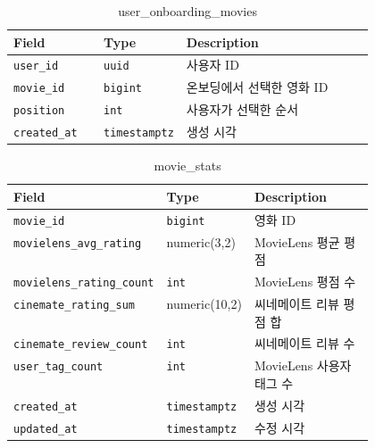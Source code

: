 \documentclass[11pt,a4paper]{article}
\renewcommand{\arraystretch}{1.18}
\begin{document}
\begin{table}[H]
\centering
\footnotesize
\setlength{\tabcolsep}{5pt}
\renewcommand{\arraystretch}{1.28}
\begin{tabularx}{\linewidth}{@{}>{\RaggedRight\arraybackslash}p{0.25\linewidth}>{\RaggedRight\arraybackslash}p{0.22\linewidth}>{\RaggedRight\arraybackslash}X@{}}
\toprule
\textbf{Field} & \textbf{Type} & \textbf{Description} \\
\midrule
\texttt{user\_\allowbreak{}id} & \texttt{uuid} & 사용자 ID \\
\texttt{movie\_\allowbreak{}id} & \texttt{bigint} & 온보딩에서 선택한 영화 ID \\
\texttt{position} & \texttt{int} & 사용자가 선택한 순서 \\
\texttt{created\_\allowbreak{}at} & \texttt{timestamptz} & 생성 시각 \\
\bottomrule
\end{tabularx}
\caption{user\_onboarding\_movies}
\end{table}

\begin{table}[H]
\centering
\footnotesize
\setlength{\tabcolsep}{5pt}
\renewcommand{\arraystretch}{1.28}
\begin{tabularx}{\linewidth}{@{}>{\RaggedRight\arraybackslash}p{0.25\linewidth}>{\RaggedRight\arraybackslash}p{0.22\linewidth}>{\RaggedRight\arraybackslash}X@{}}
\toprule
\textbf{Field} & \textbf{Type} & \textbf{Description} \\
\midrule
\texttt{movie\_\allowbreak{}id} & \texttt{bigint} & 영화 ID \\
\texttt{movielens\_\allowbreak{}avg\_\allowbreak{}rating} & numeric(3,2) & MovieLens 평균 평점 \\
\texttt{movielens\_\allowbreak{}rating\_\allowbreak{}count} & \texttt{int} & MovieLens 평점 수 \\
\texttt{cinemate\_\allowbreak{}rating\_\allowbreak{}sum} & numeric(10,2) & 씨네메이트 리뷰 평점 합 \\
\texttt{cinemate\_\allowbreak{}review\_\allowbreak{}count} & \texttt{int} & 씨네메이트 리뷰 수 \\
\texttt{user\_\allowbreak{}tag\_\allowbreak{}count} & \texttt{int} & MovieLens 사용자 태그 수 \\
\texttt{created\_\allowbreak{}at} & \texttt{timestamptz} & 생성 시각 \\
\texttt{updated\_\allowbreak{}at} & \texttt{timestamptz} & 수정 시각 \\
\bottomrule
\end{tabularx}
\caption{movie\_stats}
\end{table}
\end{document}
